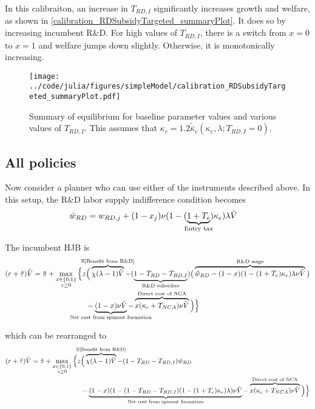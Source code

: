 \documentclass[11pt,english]{article}
\begin{document}
In this calibraiton, an increase in $T_{RD,I}$ significantly increases growth and welfare, as shown in \autoref{calibration_RDSubsidyTargeted_summaryPlot}. It does so by increasing incumbent R\&D. For high values of $T_{RD,I}$, there is a switch from $x = 0$ to $x = 1$ and welfare jumps down slightly. Otherwise, it is monotonically increasing. 

\begin{figure}[]
	\texttt{[image: ../code/julia/figures/simpleModel/calibration\_RDSubsidyTargeted\_summaryPlot.pdf]}
	\caption{Summary of equilibrium for baseline parameter values and various values of $T_{RD,I}$. This assumes that $\kappa_c = 1.2 \tilde{\bar{\kappa}}_c(\kappa_e,\lambda;T_{RD,I} = 0)$.}
	\label{calibration_RDSubsidyTargeted_summaryPlot}
\end{figure}


\subsection{All policies}

Now consider a planner who can use either of the instruments described above. In this setup, the R\&D labor supply indifference condition becomes
\begin{align}
\hat{w}_{RD} &= w_{RD,j} + (1-x_j) \nu (1-(\underbrace{1+T_e}_{\mathclap{\text{Entry tax}}})\kappa_e) \lambda \tilde{V} \label{eq:RD_worker_indifference_all}
\end{align}

The incumbent HJB is
\begin{align}
(r + \hat{\tau}) \tilde{V} = \tilde{\pi} + \max_{\substack{x \in \{0,1\} \\ z \ge 0}} \Big\{z &\Big( \overbrace{\chi (\lambda - 1) \tilde{V}}^{\mathclap{\mathbb{E}[\textrm{Benefit from R\&D}]}}-  (\underbrace{1 - T_{RD} - T_{RD,I}}_{\mathclap{\text{R\&D subsidies}}})\big( \overbrace{\hat{w}_{RD} - (1-x)(1-(1+T_e)\kappa_e)\lambda \nu \tilde{V}}^{\mathclap{\text{R\&D wage}}}\big) \label{eq:hjb_incumbent_all} \nonumber \\ 
&-  \underbrace{(1-x) \nu \tilde{V}}_{\mathclap{\text{Net cost from spinout formation}}} - \overbrace{x (\kappa_{c} + T_{NCA}) \nu \tilde{V}}^{\mathclap{\text{Direct cost of NCA}}}\Big) \Big\} 
\end{align}

which can be rearranged to
\begin{align}
(r + \hat{\tau}) \tilde{V} = \tilde{\pi} + \max_{\substack{x \in \{0,1\} \\ z \ge 0}} \Big\{z &\Big( \overbrace{\chi (\lambda - 1) \tilde{V}}^{\mathclap{\mathbb{E}[\textrm{Benefit from R\&D}]}}- (1-T_{RD}- T_{RD,I})\hat{w}_{RD} \\
&-  \underbrace{(1-x)(1 - (1-T_{RD} - T_{RD,I})(1-(1+T_e)\kappa_{e})\lambda)\nu \tilde{V}}_{\mathclap{\text{Net cost from spinout formation}}} - \overbrace{x (\kappa_{c} + T_{NCA}) \nu \tilde{V}}^{\mathclap{\text{Direct cost of NCA}}}\Big) \Big\} \label{eq:hjb_incumbent_all_2}
\end{align}
\end{document}
